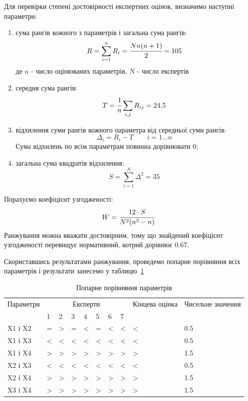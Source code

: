 Для перевірки степені достовірності експертних оцінок, визначимо наступні параметри: 
\begin{enumerate}
	\item сума рангів кожного з параметрів і загальна сума рангів:
	\begin{equation}
		R = \sum\limits_{i=1}^{n} R_i = \cfrac{Nn(n+1)}{2} = 105 
	\end{equation}
	де $n$ - число оцінюваних параметрів, $N$ - число експертів
	
	\item середня сума рангів:
	\begin{equation}
		T = \cfrac 1n \sum\limits_{i,j} R_{ij} = 24.5
	\end{equation}
	
	\item відхилення суми рангів кожного параметра від середньої суми рангів:
	\begin{equation}
		\Delta_i = R_i - T \qquad i=1\ldots n
	\end{equation}
	Сума відхилень по всім параметрам повинна дорівнювати $0$;
	
	\item загальна сума квадратів відхилення:
	\begin{equation}
		S = \sum\limits_{i=1}^{N} \Delta^2 = 35
	\end{equation}
\end{enumerate}

Порахуємо коефіцієнт узгодженості: 
\begin{equation}
	W = \cfrac{12\cdot S}{N^2(n^3-n)}
\end{equation}
Ранжування можна вважати достовірним, тому що знайдений коефіцієнт узгодженості перевищує нормативний, котрий дорівнює $0.67$.

Скориставшись результатами ранжування, проведемо попарне порівняння всіх параметрів і результати занесемо у таблицю~\ref{tab:economics:pair_wise_eval}
\begin{table}[H]
	\caption{Попарне порівняння параметрів}
	\centering
	\begin{tabular}{| p{} | p{} | p{} | p{} | p{} | p{} | p{} | p{} | p{}|p{}|}
	\hline
	Параметри	& \multicolumn{7}{c|}{Експерти} & Кінцева оцінка & Чисельне значення \\
	\cline{2-8}
				& 1 & 2 & 3 & 4 & 5 & 6 & 7		&				& \\
	\hline
	X1 і X2 &=& >& =& <& =& <& <& < & 0.5 \\
	\hline
	X1 і X3 &< &< &< &< &< &< &< &< & 0.5\\
	\hline	
	X1 і X4 &> &> &> &> &> &> &> &> & 1.5\\
	\hline	
	X2 і X3 &< &< &< &< &< &< &< &< & 0.5\\
	\hline	
	X2 і X4 &> &> &> &> &> &> &> &> & 1.5\\
	\hline	
	X3 і X4 &> &> &> &> &> &> &> &>	 & 1.5 \\
	\hline	
	\end{tabular}
	\label{tab:economics:pair_wise_eval}
\end{table}

